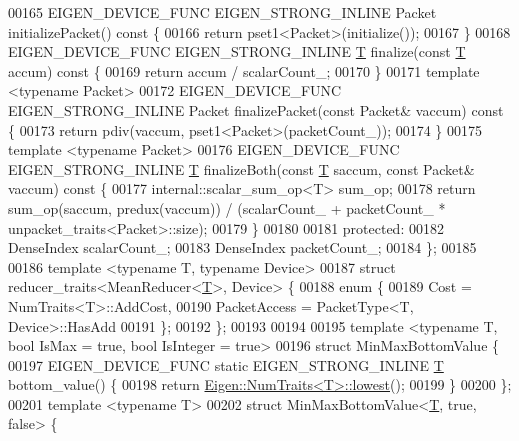 \begin{DoxyCode}
00165   EIGEN\_DEVICE\_FUNC EIGEN\_STRONG\_INLINE Packet initializePacket()\textcolor{keyword}{ const }\{
00166     \textcolor{keywordflow}{return} pset1<Packet>(initialize());
00167   \}
00168   EIGEN\_DEVICE\_FUNC EIGEN\_STRONG\_INLINE \hyperlink{group___sparse_core___module_class_eigen_1_1_triplet}{T} finalize(\textcolor{keyword}{const} \hyperlink{group___sparse_core___module_class_eigen_1_1_triplet}{T} accum)\textcolor{keyword}{ const }\{
00169     \textcolor{keywordflow}{return} accum / scalarCount\_;
00170   \}
00171   \textcolor{keyword}{template} <\textcolor{keyword}{typename} Packet>
00172   EIGEN\_DEVICE\_FUNC EIGEN\_STRONG\_INLINE Packet finalizePacket(\textcolor{keyword}{const} Packet& vaccum)\textcolor{keyword}{ const }\{
00173     \textcolor{keywordflow}{return} pdiv(vaccum, pset1<Packet>(packetCount\_));
00174   \}
00175   \textcolor{keyword}{template} <\textcolor{keyword}{typename} Packet>
00176   EIGEN\_DEVICE\_FUNC EIGEN\_STRONG\_INLINE \hyperlink{group___sparse_core___module_class_eigen_1_1_triplet}{T} finalizeBoth(\textcolor{keyword}{const} \hyperlink{group___sparse_core___module_class_eigen_1_1_triplet}{T} saccum, \textcolor{keyword}{const} Packet& vaccum)\textcolor{keyword}{ const }\{
00177     internal::scalar\_sum\_op<T> sum\_op;
00178     \textcolor{keywordflow}{return} sum\_op(saccum, predux(vaccum)) / (scalarCount\_ + packetCount\_ * unpacket\_traits<Packet>::size);
00179   \}
00180 
00181   \textcolor{keyword}{protected}:
00182     DenseIndex scalarCount\_;
00183     DenseIndex packetCount\_;
00184 \};
00185 
00186 \textcolor{keyword}{template} <\textcolor{keyword}{typename} T, \textcolor{keyword}{typename} Device>
00187 \textcolor{keyword}{struct }reducer\_traits<MeanReducer<\hyperlink{group___sparse_core___module_class_eigen_1_1_triplet}{T}>, Device> \{
00188   \textcolor{keyword}{enum} \{
00189     Cost = NumTraits<T>::AddCost,
00190     PacketAccess = PacketType<T, Device>::HasAdd
00191   \};
00192 \};
00193 
00194 
00195 \textcolor{keyword}{template} <\textcolor{keyword}{typename} T, \textcolor{keywordtype}{bool} IsMax = true, \textcolor{keywordtype}{bool} IsInteger = true>
00196 \textcolor{keyword}{struct }MinMaxBottomValue \{
00197   EIGEN\_DEVICE\_FUNC \textcolor{keyword}{static} EIGEN\_STRONG\_INLINE \hyperlink{group___sparse_core___module_class_eigen_1_1_triplet}{T} bottom\_value() \{
00198     \textcolor{keywordflow}{return} \hyperlink{group___core___module_struct_eigen_1_1_num_traits}{Eigen::NumTraits<T>::lowest}();
00199   \}
00200 \};
00201 \textcolor{keyword}{template} <\textcolor{keyword}{typename} T>
00202 \textcolor{keyword}{struct }MinMaxBottomValue<\hyperlink{group___sparse_core___module_class_eigen_1_1_triplet}{T}, true, false> \{

\end{DoxyCode}

